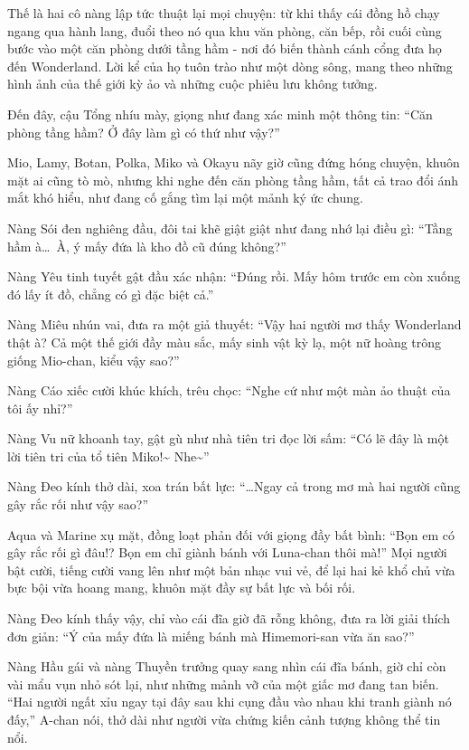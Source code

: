 \documentclass[../main.tex]{subfiles}
\begin{document}
Thế là hai cô nàng lập tức thuật lại mọi chuyện: từ khi thấy cái đồng hồ chạy ngang qua hành lang, đuổi theo nó qua khu văn phòng, căn bếp, rồi cuối cùng bước vào một căn phòng dưới tầng hầm - nơi đó biến thành cánh cổng đưa họ đến Wonderland. Lời kể của họ tuôn trào như một dòng sông, mang theo những hình ảnh của thế giới kỳ ảo và những cuộc phiêu lưu không tưởng.

Đến đây, cậu Tổng nhíu mày, giọng như đang xác minh một thông tin: ``Căn phòng tầng hầm? Ở đây làm gì có thứ như vậy?''

Mio, Lamy, Botan, Polka, Miko và Okayu nãy giờ cũng đứng hóng chuyện, khuôn mặt ai cũng tò mò, nhưng khi nghe đến căn phòng tầng hầm, tất cả trao đổi ánh mắt khó hiểu, như đang cố gắng tìm lại một mảnh ký ức chung.

Nàng Sói đen nghiêng đầu, đôi tai khẽ giật giật như đang nhớ lại điều gì: ``Tầng hầm à\dots\ À, ý mấy đứa là kho đồ cũ đúng không?''

Nàng Yêu tinh tuyết gật đầu xác nhận: ``Đúng rồi. Mấy hôm trước em còn xuống đó lấy ít đồ, chẳng có gì đặc biệt cả.''

Nàng Miêu nhún vai, đưa ra một giả thuyết: ``Vậy hai người mơ thấy Wonderland thật à? Cả một thế giới đầy màu sắc, mấy sinh vật kỳ lạ, một nữ hoàng trông giống Mio-chan, kiểu vậy sao?''

Nàng Cáo xiếc cười khúc khích, trêu chọc: ``Nghe cứ như một màn ảo thuật của tôi ấy nhỉ?''

Nàng Vu nữ khoanh tay, gật gù như nhà tiên tri đọc lời sấm: ``Có lẽ đây là một lời tiên tri của tổ tiên Miko!\~{} Nhe\~{}''

Nàng Đeo kính thở dài, xoa trán bất lực: ``\dots Ngay cả trong mơ mà hai người cũng gây rắc rối như vậy sao?''

Aqua và Marine xụ mặt, đồng loạt phản đối với giọng đầy bất bình: ``Bọn em có gây rắc rối gì đâu!? Bọn em chỉ giành bánh với Luna-chan thôi mà!'' Mọi người bật cười, tiếng cười vang lên như một bản nhạc vui vẻ, để lại hai kẻ khổ chủ vừa bực bội vừa hoang mang, khuôn mặt đầy sự bất lực và bối rối.

Nàng Đeo kính thấy vậy, chỉ vào cái đĩa giờ đã rỗng không, đưa ra lời giải thích đơn giản: ``Ý của mấy đứa là miếng bánh mà Himemori-san vừa ăn sao?''

Nàng Hầu gái và nàng Thuyền trưởng quay sang nhìn cái đĩa bánh, giờ chỉ còn vài mẩu vụn nhỏ sót lại, như những mảnh vỡ của một giấc mơ đang tan biến. ``Hai người ngất xỉu ngay tại đây sau khi cụng đầu vào nhau khi tranh giành nó đấy,'' A-chan nói, thở dài như người vừa chứng kiến cảnh tượng không thể tin nổi.
\end{document}
